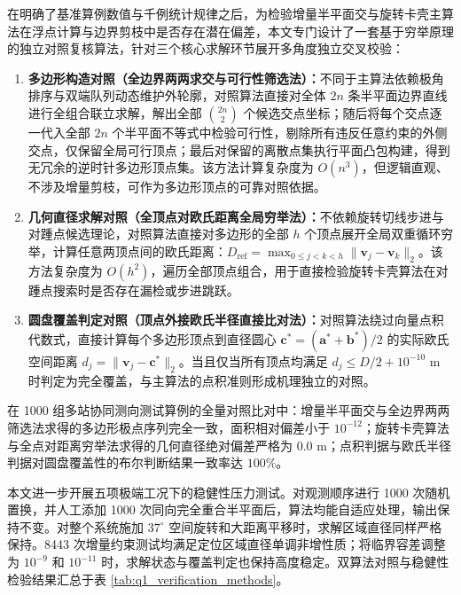 \documentclass[zihao=-4,a4paper,UTF8]{ctexart}
\begin{document}
在明确了基准算例数值与千例统计规律之后，为检验增量半平面交与旋转卡壳主算法在浮点计算与边界剪枝中是否存在潜在偏差，本文专门设计了一套基于穷举原理的独立对照复核算法，针对三个核心求解环节展开多角度独立交叉校验：
\begin{enumerate}[leftmargin=2.5em, itemsep=0.2em]
    \item \textbf{多边形构造对照（全边界两两求交与可行性筛选法）：}不同于主算法依赖极角排序与双端队列动态维护外轮廓，对照算法直接对全体 $2n$ 条半平面边界直线进行全组合联立求解，解出全部 $\binom{2n}{2}$ 个候选交点坐标；随后将每个交点逐一代入全部 $2n$ 个半平面不等式中检验可行性，剔除所有违反任意约束的外侧交点，仅保留全局可行顶点；最后对保留的离散点集执行平面凸包构建，得到无冗余的逆时针多边形顶点集。该方法计算复杂度为 $O(n^3)$，但逻辑直观、不涉及增量剪枝，可作为多边形顶点的可靠对照依据。
    \item \textbf{几何直径求解对照（全顶点对欧氏距离全局穷举法）：}不依赖旋转切线步进与对踵点候选理论，对照算法直接对多边形的全部 $h$ 个顶点展开全局双重循环穷举，计算任意两顶点间的欧氏距离：$D_{\text{ref}} = \max_{0 \le j < k < h} \|\mathbf{v}_j - \mathbf{v}_k\|_2$。该方法复杂度为 $O(h^2)$，遍历全部顶点组合，用于直接检验旋转卡壳算法在对踵点搜索时是否存在漏检或步进跳跃。
    \item \textbf{圆盘覆盖判定对照（顶点外接欧氏半径直接比对法）：}对照算法绕过向量点积代数式，直接计算每个多边形顶点到直径圆心 $\mathbf{c}^* = (\mathbf{a}^* + \mathbf{b}^*)/2$ 的实际欧氏空间距离 $d_j = \|\mathbf{v}_j - \mathbf{c}^*\|_2$。当且仅当所有顶点均满足 $d_j \le D/2 + 10^{-10}\text{ m}$ 时判定为完全覆盖，与主算法的点积准则形成机理独立的对照。
\end{enumerate}

在 1000 组多站协同测向测试算例的全量对照比对中：增量半平面交与全边界两两筛选法求得的多边形极点序列完全一致，面积相对偏差小于 $10^{-12}$；旋转卡壳算法与全点对距离穷举法求得的几何直径绝对偏差严格为 $0.0\text{ m}$；点积判据与欧氏半径判据对圆盘覆盖性的布尔判断结果一致率达 $100\%$。

本文进一步开展五项极端工况下的稳健性压力测试。对观测顺序进行 1000 次随机置换，并人工添加 1000 次同向完全重合半平面后，算法均能自适应处理，输出保持不变。对整个系统施加 $37^\circ$ 空间旋转和大距离平移时，求解区域直径同样严格保持。8443 次增量约束测试均满足定位区域直径单调非增性质；将临界容差调整为 $10^{-9}$ 和 $10^{-11}$ 时，求解状态与覆盖判定也保持高度稳定。双算法对照与稳健性检验结果汇总于表 \ref{tab:q1_verification_methods}。
\end{document}
